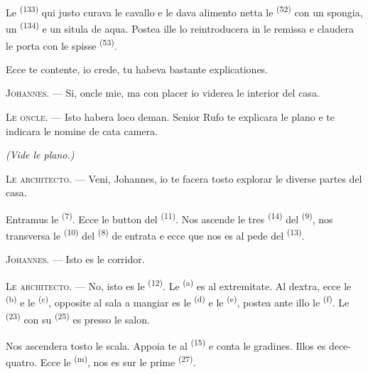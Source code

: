 Le  \textsuperscript{(133)} qui justo curava le cavallo e le
dava alimento netta le  \textsuperscript{(52)} con un spongia,
un  \textsuperscript{(134)} e un situla de aqua. Postea
ille lo reintroducera in le remissa e claudera le porta con le spisse
 \textsuperscript{(53)}.

Ecce te contente, io crede, tu habeva bastante explicationes.

\textsc{Johannes}. --- Si, oncle mie, ma con placer io viderea le interior del
casa.

\textsc{Le oncle}. --- Isto habera loco deman. Senior Rufo te explicara le plano
e te indicara le nomine de cata camera.

\VUsaut{3.0mm}
\VUsaut{2.4mm}

{\centering\textit{(Vide le plano.)}\par}
\VUsaut{2.4mm}

\textsc{Le architecto}. --- Veni, Johannes, io te facera tosto explorar le
diverse partes del casa.

Entramus le  \textsuperscript{(7)}. Ecce le button del
 \textsuperscript{(11)}. Nos ascende le tres 
\textsuperscript{(14)} del  \textsuperscript{(9)}, nos transversa
le  \textsuperscript{(10)} del 
\textsuperscript{(8)} de entrata e ecce que nos es al pede del 
\textsuperscript{(13)}.

\textsc{Johannes}. --- Isto es le corridor.

\textsc{Le architecto}. --- No, isto es le 
\textsuperscript{(12)}. Le  \textsuperscript{(a)} es al
extremitate. Al dextra, ecce le  \textsuperscript{(b)} e le
 \textsuperscript{(c)}, opposite al sala a mangiar es le
 \textsuperscript{(d)} e le 
\textsuperscript{(e)}, postea ante illo le 
\textsuperscript{(f)}. Le  \textsuperscript{(23)} con su
 \textsuperscript{(25)} es presso le salon.

Nos ascendera tosto le scala. Appoia te al 
\textsuperscript{(15)} e conta le gradines. Illos es dece-quatro. Ecce le
 \textsuperscript{(m)}, nos es sur le prime 
\textsuperscript{(27)}.

